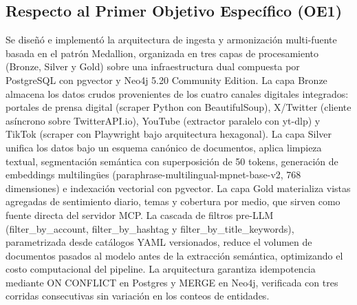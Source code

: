\subsection*{Respecto al Primer Objetivo Específico (OE1)}
Se diseñó e implementó la arquitectura de ingesta y armonización multi-fuente basada en el patrón Medallion, organizada en tres capas de procesamiento (Bronze, Silver y Gold) sobre una infraestructura dual compuesta por PostgreSQL con pgvector y Neo4j 5.20 Community Edition. La capa Bronze almacena los datos crudos provenientes de los cuatro canales digitales integrados: portales de prensa digital (scraper Python con BeautifulSoup), X/Twitter (cliente asíncrono sobre TwitterAPI.io), YouTube (extractor paralelo con yt-dlp) y TikTok (scraper con Playwright bajo arquitectura hexagonal). La capa Silver unifica los datos bajo un esquema canónico de documentos, aplica limpieza textual, segmentación semántica con superposición de 50 tokens, generación de embeddings multilingües (paraphrase-multilingual-mpnet-base-v2, 768 dimensiones) e indexación vectorial con pgvector. La capa Gold materializa vistas agregadas de sentimiento diario, temas y cobertura por medio, que sirven como fuente directa del servidor MCP. La cascada de filtros pre-LLM (filter\_by\_account, filter\_by\_hashtag y filter\_by\_title\_keywords), parametrizada desde catálogos YAML versionados, reduce el volumen de documentos pasados al modelo antes de la extracción semántica, optimizando el costo computacional del pipeline. La arquitectura garantiza idempotencia mediante ON CONFLICT en Postgres y MERGE en Neo4j, verificada con tres corridas consecutivas sin variación en los conteos de entidades.

